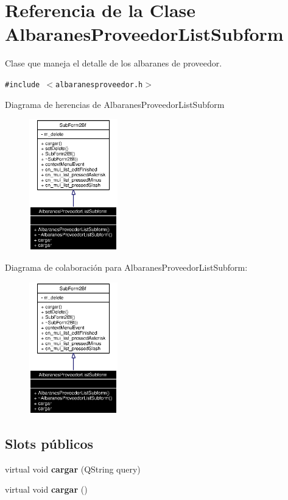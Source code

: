 \section{Referencia de la Clase Albaranes\-Proveedor\-List\-Subform}
\label{classAlbaranesProveedorListSubform}
Clase que maneja el detalle de los albaranes de proveedor.  


{\tt \#include $<$albaranesproveedor.h$>$}

Diagrama de herencias de Albaranes\-Proveedor\-List\-Subform\begin{figure}[H]
\begin{center}
\leavevmode
\includegraphics[width=109pt]{classAlbaranesProveedorListSubform__inherit__graph}
\end{center}
\end{figure}
Diagrama de colaboraci\'{o}n para Albaranes\-Proveedor\-List\-Subform:\begin{figure}[H]
\begin{center}
\leavevmode
\includegraphics[width=109pt]{classAlbaranesProveedorListSubform__coll__graph}
\end{center}
\end{figure}
\subsection*{Slots p\'{u}blicos}
\begin{CompactItemize}
\item 
virtual void {\bf cargar} (QString query)\label{classAlbaranesProveedorListSubform_i0}

\item 
virtual void {\bf cargar} ()\label{classAlbaranesProveedorListSubform_i1}

\end{CompactItemize}
